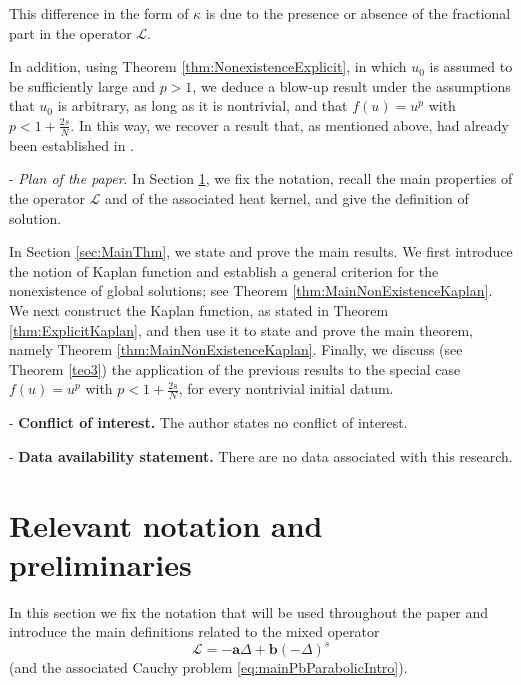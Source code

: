 \documentclass[11pt,a4paper,reqno]{amsart}
\theoremstyle{definition}
\theoremstyle{plain}
\numberwithin{equation}{section}
\begin{document}
This difference in the form of $\kappa$ is due to the presence or
absence of the fractional part in the operator $\mathcal L$.

In addition, using Theorem \ref{thm:NonexistenceExplicit}, in which $u_0$ is assumed to be
sufficiently large and $p>1$, we deduce a blow-up result under the
assumptions that $u_0$ is arbitrary, as long as it is nontrivial, and
that $f(u)=u^p$ with $p<1+\frac{2s}{N}$. In this way, we recover a result that, as
mentioned above, had already been established in \cite{BPV}.






\medskip
\bigskip




\noindent -\,\,\emph{Plan of the paper}. In Section \ref{sec.Prel}, we fix the notation, recall the main properties of the
operator $\mathcal L$ and of the associated heat kernel, and give the
definition of solution.

In Section \ref{sec:MainThm}, we state and prove the main results. We first introduce
the notion of Kaplan function and establish a general criterion for
the nonexistence of global solutions; see
Theorem \ref{thm:MainNonExistenceKaplan}. We next construct the Kaplan function, as stated in
Theorem \ref{thm:ExplicitKaplan}, and then use it to state and prove
the main theorem, namely
Theorem \ref{thm:MainNonExistenceKaplan}. Finally, we discuss (see Theorem \ref{teo3}) the application of the
previous results to the special case $f(u)=u^p$ with
$p<1+\frac{2s}{N}$, for every nontrivial initial datum.



\bigskip
\medskip


\noindent-\,\,\textbf{Conflict of interest.} The author states no conflict of interest.


\noindent-\,\,\textbf{Data availability statement.} There are no data associated with this research.

\section{Relevant notation and preliminaries}\label{sec.Prel}

In this section we fix the notation that will be used throughout the paper and introduce the main definitions related to the mixed operator
$$\mathcal{L} = -\mathbf{a}\Delta + \mathbf{b}(-\Delta)^s$$
(and the associated Cauchy problem \eqref{eq:mainPbParabolicIntro}).
\end{document}
